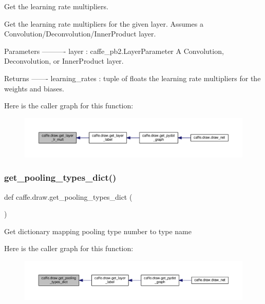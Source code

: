 \begin{DoxyVerb}Get the learning rate multipliers.

Get the learning rate multipliers for the given layer. Assumes a
Convolution/Deconvolution/InnerProduct layer.

Parameters
----------
layer : caffe_pb2.LayerParameter
    A Convolution, Deconvolution, or InnerProduct layer.

Returns
-------
learning_rates : tuple of floats
    the learning rate multipliers for the weights and biases.
\end{DoxyVerb}
 Here is the caller graph for this function\+:
\nopagebreak
\begin{figure}[H]
\begin{center}
\leavevmode
\includegraphics[width=350pt]{namespacecaffe_1_1draw_ac1df68579f91acefee36f75ac5b0de1d_icgraph}
\end{center}
\end{figure}
\mbox{\label{namespacecaffe_1_1draw_a18df1acb5bad222d90e8873375367ef1}} 
\subsubsection{\texorpdfstring{get\+\_\+pooling\+\_\+types\+\_\+dict()}{get\_pooling\_types\_dict()}}
{\footnotesize\ttfamily def caffe.\+draw.\+get\+\_\+pooling\+\_\+types\+\_\+dict (\begin{DoxyParamCaption}{ }\end{DoxyParamCaption})}

\begin{DoxyVerb}Get dictionary mapping pooling type number to type name
\end{DoxyVerb}
 Here is the caller graph for this function\+:
\nopagebreak
\begin{figure}[H]
\begin{center}
\leavevmode
\includegraphics[width=350pt]{namespacecaffe_1_1draw_a18df1acb5bad222d90e8873375367ef1_icgraph}
\end{center}
\end{figure}
\mbox{\label{namespacecaffe_1_1draw_a679642bc8af6fb5382480cfad0c27111}} 
